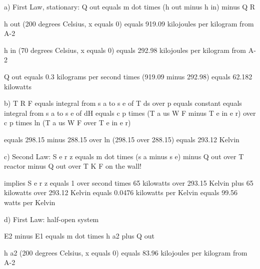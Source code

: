 a) First Law, stationary: Q out equals m dot times (h out minus h in) minus Q R

h out (200 degrees Celsius, x equals 0) equals 919.09 kilojoules per kilogram from A-2

h in (70 degrees Celsius, x equals 0) equals 292.98 kilojoules per kilogram from A-2

Q out equals 0.3 kilograms per second times (919.09 minus 292.98) equals 62.182 kilowatts

b) T R F equals integral from s a to s e of T ds over p equals constant equals integral from s a to s e of dH equals c p times (T a us W F minus T e in e r) over c p times ln (T a us W F over T e in e r)

equals 298.15 minus 288.15 over ln (298.15 over 288.15) equals 293.12 Kelvin

c) Second Law: S e r z equals m dot times (s a minus s e) minus Q out over T reactor minus Q out over T K F on the wall!

implies S e r z equals 1 over second times 65 kilowatts over 293.15 Kelvin plus 65 kilowatts over 293.12 Kelvin equals 0.0476 kilowatts per Kelvin equals 99.56 watts per Kelvin

d) First Law: half-open system

E2 minus E1 equals m dot times h a2 plus Q out

h a2 (200 degrees Celsius, x equals 0) equals 83.96 kilojoules per kilogram from A-2